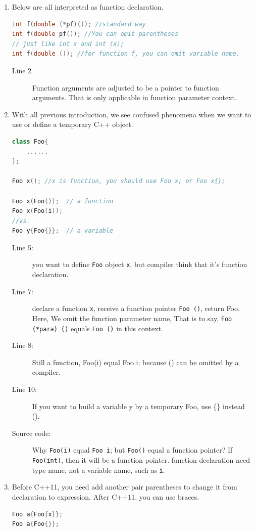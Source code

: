 \documentclass[a4paper,11pt,twoside]{book}
\begin{document}
\begin{enumerate}
	\item Below are all interpreted as function declaration. 
\begin{lstlisting}[frame=single, language=c++, mathescape=true]
int f(double (*pf)()); //standard way
int f(double pf()); //You can omit parentheses
// just like int x and int (x);
int f(double ()); //for function f, you can omit variable name.
\end{lstlisting}
\begin{description}
    \item[Line 2] Function arguments are adjusted to be a pointer to function arguments. That is only applicable in function parameter context. 
\end{description}

	\item With all previous introduction, we see confused phenomena when we want to use or define a temporary C++ object. 
\begin{lstlisting}[frame=single, language=c++]
class Foo{
	......
};
	
Foo x(); //x is function, you should use Foo x; or Foo x{};
	
Foo x(Foo());  // a function
Foo x(Foo(i)); 
//vs.
Foo y{Foo{}};  // a variable
\end{lstlisting}
\begin{description}
	\item[Line 5:] you want to define \texttt{Foo} object \texttt{x}, but compiler think that it's function declaration. 
	\item[Line 7:] declare a function \texttt{x}, receive a function pointer \texttt{Foo ()}, return Foo. Here, We omit the function parameter name, That is to say,  \texttt{Foo (*para) ()}  equals \texttt{Foo  ()} in this context.
	\item[Line 8:] Still a function, Foo(i) equal Foo i; because () can be omitted by a compiler. 
	\item[Line 10:] If you want to build a variable y by a temporary Foo, use \{\} instead ().
	\item[Source code:]  Why \texttt{Foo(i)} equal \texttt{Foo i}; but \texttt{Foo()} equal a function pointer? If \texttt{Foo(int)}, then it will be a function pointer.  function declaration need type name, not a variable name, such as \texttt{i}.	
\end{description}




	\item Before C++11, you need add another pair parentheses to change it from declaration to expression. After C++11, you can use braces.
\begin{lstlisting}[frame=single, language=c++, mathescape=true]
Foo a{Foo{x}}; 
Foo a{Foo{}};
\end{lstlisting} 


\end{enumerate}
\end{document}
